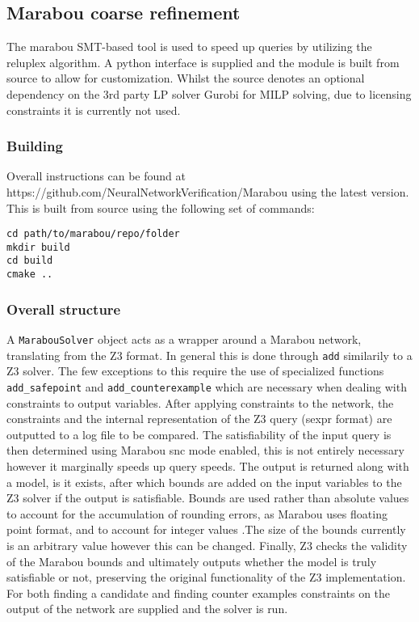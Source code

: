 \documentclass[a4paper,parskip=half]{scrartcl}
\begin{document}
\subsection{Marabou coarse refinement}

The marabou SMT-based tool is used to speed up queries by utilizing the reluplex algorithm. A python interface is supplied and the module is built from source to allow for customization. Whilst the source denotes an optional dependency on the 3rd party LP solver Gurobi for MILP solving, due to licensing constraints it is currently not used.

\subsubsection{Building}

Overall instructions can be found at https://github.com/NeuralNetworkVerification/Marabou using the latest version. This is built from source using the following set of commands:

\begin{verbatim}
cd path/to/marabou/repo/folder
mkdir build 
cd build
cmake ..
\end{verbatim}

\subsubsection{Overall structure}

A \verb+MarabouSolver+ object acts as a wrapper around a Marabou network, translating from the Z3 format. In general this is done through \verb+add+ similarily to a Z3 solver. The few exceptions to this require the use of specialized functions \verb+add_safepoint+ and \verb+add_counterexample+ which are necessary when dealing with constraints to output variables. After applying constraints to the network, the constraints and the internal representation of the Z3 query (sexpr format) are outputted to a log file to be compared. The satisfiability of the input query is then determined using Marabou snc mode enabled, this is not entirely necessary however it marginally speeds up query speeds. The output is returned along with a model, is it exists, after which bounds are added on the input variables to the Z3 solver if the output is satisfiable. Bounds are used rather than absolute values to account for the accumulation of rounding errors, as Marabou uses floating point format, and to account for integer values .The size of the bounds currently is an arbitrary value however this can be changed. Finally, Z3 checks the validity of the Marabou bounds and ultimately outputs whether the model is truly satisfiable or not, preserving the original functionality of the Z3 implementation. 
For both finding a candidate and finding counter examples constraints on the output of the network are supplied and the solver is run. 
\end{document}
